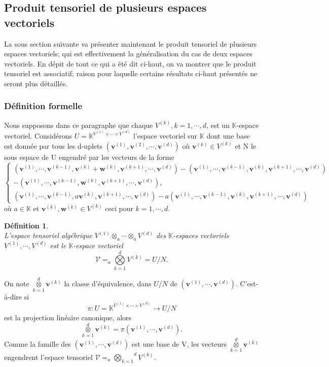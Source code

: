 \documentclass[11pt,a4paper,oneside]{book}
\newtheorem{defi}{Définition}[chapter]
\def\K{\mathbb K}
\def\V{\mathcal V}
\def\agktensor{_{a}\overset{d}{\underset{k=1}{\bigotimes}}}
\def\ktensor{\overset{d}{\underset{k=1}{\otimes}}}
\def\v{\mathbf v}
\def\w{\mathbf w}
\begin{document}
\subsection{Produit tensoriel de plusieurs espaces vectoriels}
La sous section suivante va présenter maintenant le produit tensoriel de plusieurs espaces vectoriels; qui est effectivement la généralisation du cas de deux espaces vectoriels. En dépit de tout ce qui a été dit ci-haut, on va montrer que le produit tensoriel est associatif; raison pour laquelle certains résultats ci-haut présentés ne seront plus détaillés.
\subsubsection{Définition formelle}
Nous supposons dans ce paragraphe que chaque $ V^{(k)}, k = 1,\cdots,d $, est un $ \K $-espace vectoriel. Considérons $ U = \K^{V^{(1)}\times \cdots\times V^{(d)}} $ l'espace vectoriel sur $ \K $ dont une base est donnée par tous les d-uplets $ (\v^{(1)}, \v^{(2)},\cdots, \v^{(d)}) $
où $ \v^{(k)} \in V^{(k)} $ et N le sous espace de U engendré par les vecteurs de la forme
$$\begin{cases}
(\v^{(1)},\cdots,\v^{(k-1)},\v^{(k)}+\w^{(k)},\v^{(k+1)},\cdots,\v^{(d)})-(\v^{(1)},\cdots,\v^{(k-1)},\v^{(k)},\v^{(k+1)},\cdots,\v^{(d)})\\
-(\v^{(1)},\cdots,\v^{(k-1)},\w^{(k)},\v^{(k+1)},\cdots,\v^{(d)}),\\
(\v^{(1)},\cdots,\v^{(k-1)},a\v^{(k)},\v^{(k+1)},\cdots,\v^{(d)})-a(\v^{(1)},\cdots,\v^{(k-1)},\v^{(k)},\v^{(k+1)},\cdots,\v^{(d)})
\end{cases} $$
où $ a\in\K $ et $ \v^{(k)},\w^{(k)}\in V^{(k)} $ ceci pour $ k=1,\cdots,d. $

\begin{defi}
	\emph{\\}
L'espace tensoriel algébrique $ V^{(1)}\otimes_{a}\cdots\otimes_{a}V^{(d)} $ des $ \K $-espaces vectoriels $ V^{(1)},\cdots,V^{(d)} $ est le $ \K $-espace vectoriel $$\V=\agktensor V^{(k)}= U/N. $$
\end{defi}
On note $ \ktensor \v^{(k)} $ la classe d'équivalence, dans $ U/N $ de $ (\v^{(1)},\cdots,\v^{(d)}) $. C'est-à-dire si $$\pi :U=\K^{V^{(1)}\times \cdots\times V^{(d)}}\longrightarrow U/N$$ est la projection linéaire canonique, alors
$$\ktensor \v^{(k)}=\pi(\v^{(1)},\cdots,\v^{(d)}). $$
Comme la famille des $ (\v^{(1)},\cdots,\v^{(d)}) $ est une base de V, les vecteurs $ \ktensor \v^{(k)} $ engendrent l'espace tensoriel $ \V=\agktensor V^{(k)} $.
 
\end{document}
